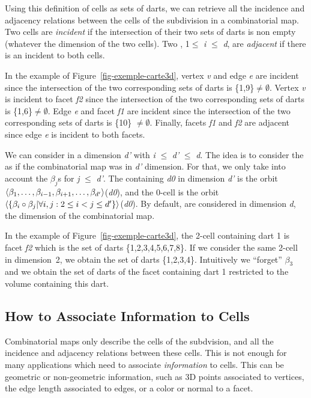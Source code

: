 Using this definition of cells as sets of darts, we can retrieve all the
incidence and adjacency relations between the cells of the subdivision
in a combinatorial map.  Two cells are \emph{incident} if the
intersection of their two sets of darts is non empty (whatever the
dimension of the two cells). Two , 1$\leq$ \emph{i} $\leq$ \emph{d}, are
\emph{adjacent} if there is an  incident to both cells.

In the example of Figure~\ref{fig-exemple-carte3d}, vertex \emph{v} and
edge \emph{e} are incident since the intersection of the two corresponding
sets of darts is \{1,9\}$\neq \emptyset$. Vertex \emph{v} is incident to facet
\emph{f2} since the intersection of the two corresponding sets of darts is
\{1,6\}$\neq \emptyset$. Edge \emph{e} and facet \emph{f1} are incident
since the intersection of the two corresponding sets of darts is
\{10\} $\neq \emptyset$. Finally, facets \emph{f1} and \emph{f2} are adjacent
since edge \emph{e} is incident to both facets.

We can consider  in a dimension \emph{d'} with  \emph{i} $\leq$ \emph{d'} $\leq$
\emph{d}. The idea is to consider the  as if the combinatorial map
was in \emph{d'} dimension. For that, we only take into account the
$\beta_j$s for \emph{j} $\leq$ \emph{d'}.  The  containing \emph{d0} in dimension
\emph{d'} is the orbit
$\langle{}\beta_1,\ldots,\beta_{i-1},\beta_{i+1},\ldots,\beta_{d'}\rangle{}$(\emph{d0}), and
the 0-cell is the orbit $\langle{}\{\beta_{i}\circ\beta_{j}|\forall i,j: 2\leq
  i<j \leq d'\}\rangle{}$(\emph{d0}).  By default,  are considered in
dimension \emph{d}, the dimension of the combinatorial map.

In the example of Figure~\ref{fig-exemple-carte3d}, the 2-cell
containing dart 1 is facet \emph{f2} which is the set of darts
\{1,2,3,4,5,6,7,8\}. If we consider the same 2-cell in dimension~2,
we obtain the set of darts \{1,2,3,4\}. Intuitively we ``forget''
$\beta_3$ and we obtain the set of darts of the facet containing dart
1 restricted to the volume containing this dart.

\subsection{How to Associate Information to Cells}
\label{ssec-associate-attributes}
Combinatorial maps only describe the cells of the subdvision, and all
the incidence and adjacency relations between these cells. This is not
enough for many applications which need to associate
\emph{information} to cells.  This can be geometric or non-geometric
information, such as 3D points associated to vertices, the edge length
associated to edges, or a color or normal to a facet.

